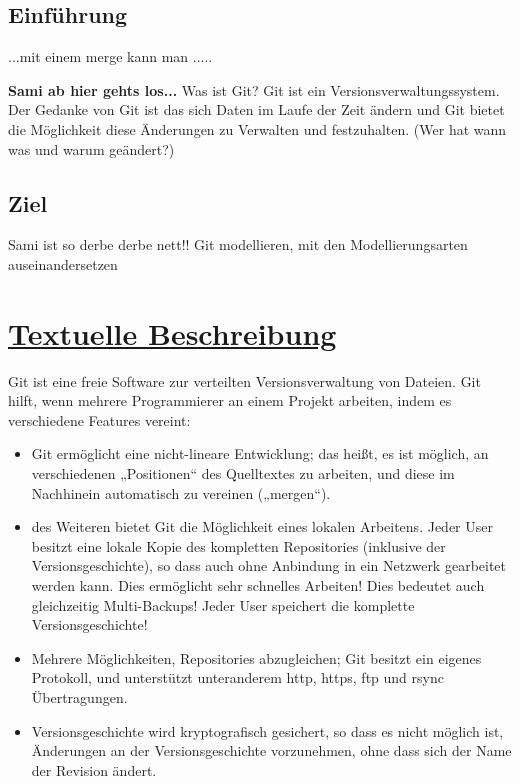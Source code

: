 \documentclass[a4paper]{article}
\begin{document}
\subsection{Einführung} 								%

...mit einem \gls{merge} kann man .....    				%

	\textbf{Sami ab hier gehts los...} 					%
Was ist Git? Git ist ein Versionsverwaltungssystem. 	
Der Gedanke von Git ist das sich Daten im Laufe der Zeit ändern und Git bietet die Möglichkeit
diese Änderungen zu Verwalten und festzuhalten. (Wer hat wann was und warum geändert?)

\subsection{Ziel}
	Sami ist so derbe derbe nett!!
	Git modellieren, mit den Modellierungsarten auseinandersetzen	
\newpage												%
\section{\underline{Textuelle Beschreibung}}

Git ist eine freie Software zur verteilten Versionsverwaltung von Dateien. Git hilft, wenn mehrere Programmierer an einem Projekt arbeiten, indem es verschiedene Features vereint:

  \begin{itemize} 										%
     
\item Git ermöglicht eine nicht-lineare Entwicklung; das heißt, es ist möglich, an verschiedenen „Positionen“ des Quelltextes zu arbeiten, und diese im Nachhinein automatisch zu vereinen („mergen“). %
\item des Weiteren bietet Git die Möglichkeit eines lokalen Arbeitens. Jeder User besitzt eine lokale Kopie des kompletten Repositories (inklusive der Versionsgeschichte), so dass auch ohne Anbindung in ein Netzwerk gearbeitet werden kann. Dies ermöglicht sehr schnelles Arbeiten!
Dies bedeutet auch gleichzeitig Multi-Backups! Jeder User speichert die komplette Versionsgeschichte!
\item Mehrere Möglichkeiten, Repositories abzugleichen; Git besitzt ein eigenes Protokoll, und unterstützt unteranderem http, https, ftp und rsync Übertragungen.
\item Versionsgeschichte wird kryptografisch gesichert, so dass es nicht möglich ist, Änderungen an der Versionsgeschichte vorzunehmen, ohne dass sich der Name der Revision ändert.

    \end{itemize} 										%
\end{document}
